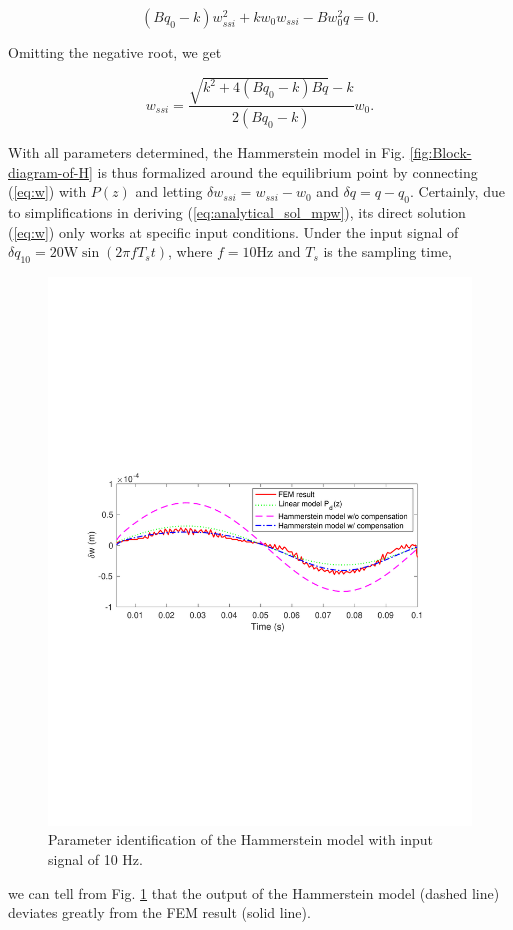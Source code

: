 \documentclass [11pt, proquest] {uwthesis}[2020/02/24]
\begin{document}
\noindent 
\begin{equation}
(Bq_{0}-k)w_{ssi}^{2}+kw_{0}w_{ssi}-Bw_{0}^{2}q=0.\label{eq:w_0}
\end{equation}

\noindent Omitting the negative root, we get

\noindent 
\begin{equation}
w_{ssi}=\frac{\sqrt{k^{2}+4(Bq_{0}-k)Bq}-k}{2(Bq_{0}-k)}w_{0}.\label{eq:w}
\end{equation}

With all parameters determined, the Hammerstein model in Fig. \ref{fig:Block-diagram-of-H}
is thus formalized around the equilibrium point by connecting (\ref{eq:w})
with $P(z)$ and letting $\delta w_{ssi}=w_{ssi}-w_{0}$ and $\delta q=q-q_{0}$.
Certainly, due to simplifications in deriving (\ref{eq:analytical_sol_mpw}),
its direct solution (\ref{eq:w}) only works at specific input conditions.
Under the input signal of $\delta q_{10}=20\text{W}\sin(2\pi fT_{s}t)$,
where $f=10\text{Hz}$ and $T_{s}$ is the sampling time, 
\begin{figure}[!ht]
\begin{centering}
\includegraphics[clip,width=13cm]{Hammerstein/parameterID}
\par\end{centering}
\centering{}\caption{\label{fig:Parameter-identification-of}Parameter identification of
the Hammerstein model with input signal of 10 Hz.}
\end{figure}
we can tell from Fig. \ref{fig:Parameter-identification-of} that
the output of the Hammerstein model (dashed line) deviates greatly
from the FEM result (solid line).
\end{document}
